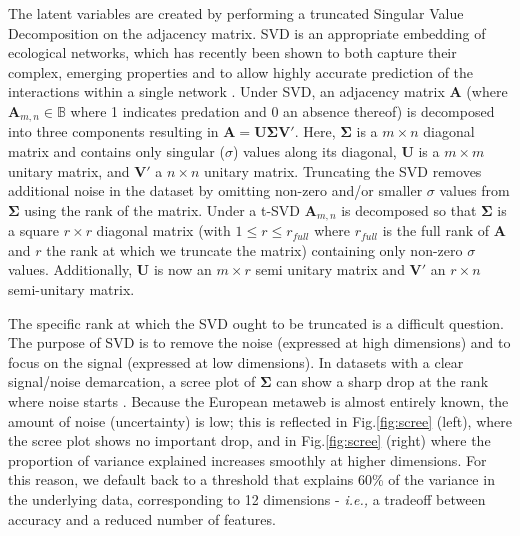 The latent variables are created by performing a truncated Singular
Value Decomposition \cite{t-SVD; @Halko2011FinStr} on the adjacency
matrix. SVD is an appropriate embedding of ecological networks, which
has recently been shown to both capture their complex, emerging
properties \cite{Strydom2021SvdEnt} and to allow highly accurate
prediction of the interactions within a single network
\cite{Poisot2021ImpMam}. Under SVD, an adjacency matrix \(\mathbf{A}\)
(where \(\mathbf{A}_{m,n}\in\mathbb{B}\) where 1 indicates predation and
0 an absence thereof) is decomposed into three components resulting in
\(\mathbf{A} = \mathbf{U}\mathbf{\Sigma}\mathbf{V'}.\) Here,
\(\mathbf{\Sigma}\) is a \(m \times n\) diagonal matrix and contains
only singular (\(\sigma\)) values along its diagonal, \(\mathbf{U}\) is
a \(m \times m\) unitary matrix, and \(\mathbf{V}'\) a \(n \times n\)
unitary matrix. Truncating the SVD removes additional noise in the
dataset by omitting non-zero and/or smaller \(\sigma\) values from
\(\mathbf{\Sigma}\) using the rank of the matrix. Under a t-SVD
\(\mathbf{A}_{m,n}\) is decomposed so that \(\mathbf{\Sigma}\) is a
square \(r \times r\) diagonal matrix (with \(1 \le r \le r_{full}\)
where \(r_{full}\) is the full rank of \(\mathbf{A}\) and \(r\) the rank
at which we truncate the matrix) containing only non-zero \(\sigma\)
values. Additionally, \(\mathbf{U}\) is now an \(m \times r\) semi
unitary matrix and \(\mathbf{V}'\) an \(r \times n\) semi-unitary
matrix.

The specific rank at which the SVD ought to be truncated is a difficult
question. The purpose of SVD is to remove the noise (expressed at high
dimensions) and to focus on the signal (expressed at low dimensions). In
datasets with a clear signal/noise demarcation, a scree plot of
\(\mathbf{\Sigma}\) can show a sharp drop at the rank where noise starts
\cite{Zhu2006AutDim}. Because the European metaweb is almost entirely
known, the amount of noise (uncertainty) is low; this is reflected in
Fig.\ref{fig:scree} (left), where the scree plot shows no important drop, and in
Fig.\ref{fig:scree} (right) where the proportion of variance explained increases
smoothly at higher dimensions. For this reason, we default back to a
threshold that explains 60\% of the variance in the underlying data,
corresponding to 12 dimensions - \emph{i.e.,} a tradeoff between accuracy
and a reduced number of features.

